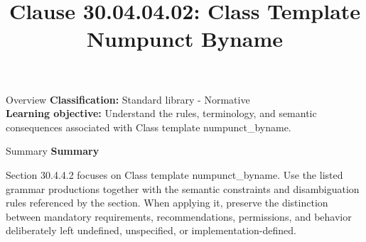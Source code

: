 \documentclass[10pt,letterpaper]{article}
\title{Clause 30.04.04.02: Class Template Numpunct Byname}
\author{}
\date{}
\begin{document}
\maketitle
\begin{CornellOverviewBox}{Overview}
\textbf{Classification:} Standard library - Normative\\[2pt]
\textbf{Learning objective:} Understand the rules, terminology, and semantic consequences associated with Class template numpunct\_byname.
\end{CornellOverviewBox}\begin{CornellSummaryBox}{Summary}
{\sffamily\bfseries\color{Accent} Summary}\par\vspace{3pt}Section 30.4.4.2 focuses on Class template numpunct\_byname. Use the listed grammar productions together with the semantic constraints and disambiguation rules referenced by the section. When applying it, preserve the distinction between mandatory requirements, recommendations, permissions, and behavior deliberately left undefined, unspecified, or implementation-defined.
\end{CornellSummaryBox}
\end{document}
